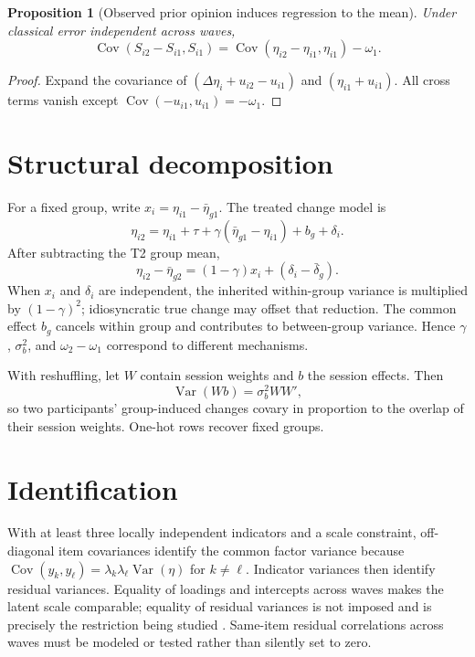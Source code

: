 \documentclass[11pt]{article}
\newtheorem{proposition}{Proposition}
\newcommand{\Var}{\operatorname{Var}}
\newcommand{\Cov}{\operatorname{Cov}}
\begin{document}
\begin{proposition}[Observed prior opinion induces regression to the mean]
Under classical error independent across waves,
\[
\Cov(S_{i2}-S_{i1},S_{i1})
=\Cov(\eta_{i2}-\eta_{i1},\eta_{i1})-\omega_1.
\]
\end{proposition}
\begin{proof}
Expand the covariance of $(\Delta\eta_i+u_{i2}-u_{i1})$ and
$(\eta_{i1}+u_{i1})$. All cross terms vanish except
$\Cov(-u_{i1},u_{i1})=-\omega_1$.
\end{proof}

\section{Structural decomposition}

For a fixed group, write $x_i=\eta_{i1}-\bar\eta_{g1}$. The treated change model
is
\[
\eta_{i2}=\eta_{i1}+\tau+\gamma(\bar\eta_{g1}-\eta_{i1})+b_g+\delta_i.
\]
After subtracting the T2 group mean,
\[
\eta_{i2}-\bar\eta_{g2}=(1-\gamma)x_i+(\delta_i-\bar\delta_g).
\]
When $x_i$ and $\delta_i$ are independent, the inherited within-group variance is
multiplied by $(1-\gamma)^2$; idiosyncratic true change may offset that reduction.
The common effect $b_g$ cancels within group and contributes to between-group
variance. Hence $\gamma$, $\sigma_b^2$, and $\omega_2-\omega_1$ correspond to
different mechanisms.

With reshuffling, let $W$ contain session weights and $b$ the session effects.
Then
\[
\Var(Wb)=\sigma_b^2WW',
\]
so two participants' group-induced changes covary in proportion to the overlap
of their session weights. One-hot rows recover fixed groups.

\section{Identification}

With at least three locally independent indicators and a scale constraint,
off-diagonal item covariances identify the common factor variance because
$\Cov(y_k,y_\ell)=\lambda_k\lambda_\ell\Var(\eta)$ for $k\ne\ell$.
Indicator variances then identify residual variances. Equality of loadings and
intercepts across waves makes the latent scale comparable; equality of residual
variances is not imposed and is precisely the restriction being studied
\citep{mcardle2009}. Same-item residual correlations across waves must be modeled
or tested rather than silently set to zero.
\end{document}

